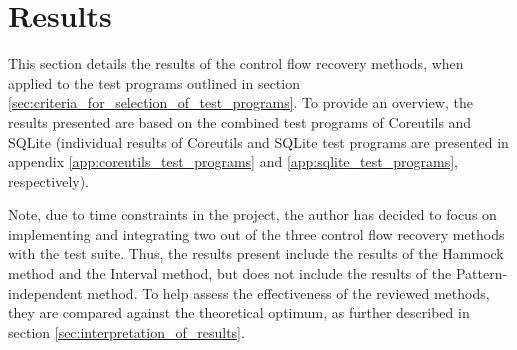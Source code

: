 
\section{Results}
\label{sec:results}

This section details the results of the control flow recovery methods, when applied to the test programs outlined in section \ref{sec:criteria_for_selection_of_test_programs}. To provide an overview, the results presented are based on the combined test programs of Coreutils and SQLite (individual results of Coreutils and SQLite test programs are presented in appendix \ref{app:coreutils_test_programs} and \ref{app:sqlite_test_programs}, respectively).

Note, due to time constraints in the project, the author has decided to focus on implementing and integrating two out of the three control flow recovery methods with the test suite. Thus, the results present include the results of the Hammock method and the Interval method, but does not include the results of the Pattern-independent method. To help assess the effectiveness of the reviewed methods, they are compared against the theoretical optimum, as further described in section \ref{sec:interpretation_of_results}.








